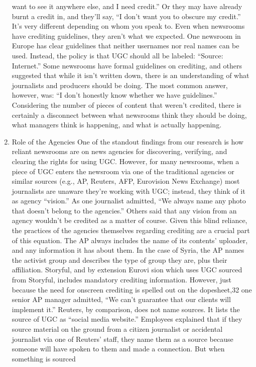 \documentclass[symmetric, notoc, nobib]{towcenter-book}
\begin{document}
\begin{enumerate}
want to see it anywhere else, and I need credit.'' Or they may have
already burnt a credit in, and they'll say, ``I don't want you to obscure
my credit.'' It's very different depending on whom you speak to.
Even when newsrooms have crediting guidelines, they aren't what we
expected. One newsroom in Europe has clear guidelines that neither usernames
nor real names can be used. Instead, the policy is that UGC should
all be labeled: ``Source: Internet.''
Some newsrooms have formal guidelines on crediting, and others suggested
that while it isn't written down, there is an understanding of what journalists
and producers should be doing. The most common answer, however,
was: ``I don't honestly know whether we have guidelines.'' Considering the
number of pieces of content that weren't credited, there is certainly a disconnect
between what newsrooms think they should be doing, what managers
think is happening, and what is actually happening.
\item Role of the Agencies
One of the standout findings from our research is how reliant newsrooms
are on news agencies for discovering, verifying, and clearing the rights for
using UGC. However, for many newsrooms, when a piece of UGC enters
the newsroom via one of the traditional agencies or similar sources (e.g.,
AP, Reuters, AFP, Eurovision News Exchange) most journalists are unaware
they're working with UGC; instead, they think of it as agency ``vision.'' As
one journalist admitted, ``We always name any photo that doesn't belong to
the agencies.'' Others said that any vision from an agency wouldn't be credited
as a matter of course.
Given this blind reliance, the practices of the agencies themselves regarding
crediting are a crucial part of this equation. The AP always includes the
name of its contents' uploader, and any information it has about them. In
the case of Syria, the AP names the activist group and describes the type
of group they are, plus their affiliation. Storyful, and by extension Eurovi
sion which uses UGC sourced from Storyful, includes mandatory crediting
information. However, just because the need for onscreen crediting is
spelled out on the dopesheet,32 one senior AP manager admitted, ``We can't
guarantee that our clients will implement it.''
Reuters, by comparison, does not name sources. It lists the source of UGC
as ``social media website.'' Employees explained that if they source material
on the ground from a citizen journalist or accidental journalist via one
of Reuters' staff, they name them as a source because someone will have
spoken to them and made a connection. But when something is sourced

\end{enumerate}
\end{document}
